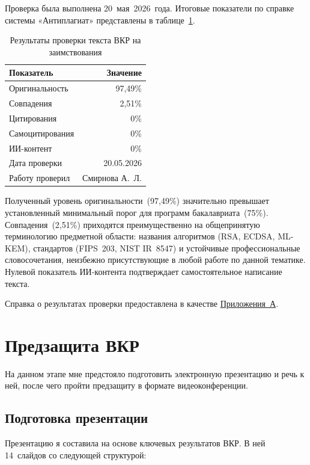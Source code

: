 \documentclass{itmo-vkr}
\begin{document}
Проверка была выполнена 20~мая~2026~года. Итоговые показатели по справке системы «Антиплагиат» представлены в таблице~\ref{tab:antiplagiat}.

\begin{table}[h]
    \caption{Результаты проверки текста ВКР на заимствования}
    \label{tab:antiplagiat}
    \begin{tabular}{|p{7cm}|r|}
        \hline
        Показатель & Значение \\ \hline
        Оригинальность & 97,49\% \\ \hline
        Совпадения & 2,51\% \\ \hline
        Цитирования & 0\% \\ \hline
        Самоцитирования & 0\% \\ \hline
        ИИ-контент & 0\% \\ \hline
        Дата проверки & 20.05.2026 \\ \hline
        Работу проверил & Смирнова А.~Л. \\ \hline
    \end{tabular}
\end{table}

Полученный уровень оригинальности~(97,49\%) значительно превышает установленный минимальный порог для программ бакалавриата~(75\%). Совпадения~(2,51\%) приходятся преимущественно на общепринятую терминологию предметной области: названия алгоритмов (RSA, ECDSA, ML-KEM), стандартов (FIPS~203, NIST IR~8547) и устойчивые профессиональные словосочетания, неизбежно присутствующие в любой работе по данной тематике. Нулевой показатель ИИ-контента подтверждает самостоятельное написание текста.

Справка о результатах проверки предоставлена в качестве \hyperref[app:A]{Приложения~А}.

\newpage

\section{Предзащита ВКР}

На данном этапе мне предстояло подготовить электронную презентацию и речь к ней, после чего пройти предзащиту в формате видеоконференции.

\subsection{Подготовка презентации}

Презентацию я составила на основе ключевых результатов ВКР. В ней 14~слайдов со следующей структурой:
\end{document}
